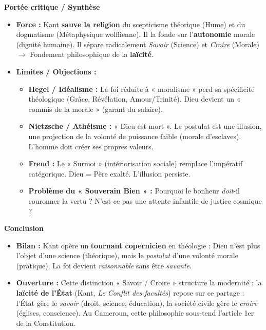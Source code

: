 \documentclass[11pt]{article}
\begin{document}
\begin{exoresolu}
\textbf{Portée critique / Synthèse}
\begin{itemize}
    \item \textbf{Force :} Kant \textbf{sauve la religion} du scepticisme théorique (Hume) et du dogmatisme (Métaphysique wolffienne). Il la fonde sur l'\textbf{autonomie} morale (dignité humaine). Il sépare radicalement \emph{Savoir} (Science) et \emph{Croire} (Morale) $\rightarrow$ Fondement philosophique de la \textbf{laïcité}.
    \item \textbf{Limites / Objections :}
    \begin{itemize}
        \item \textbf{Hegel / Idéalisme :} La foi réduite à « moralisme » perd sa spécificité théologique (Grâce, Révélation, Amour/Trinité). Dieu devient un « commis de la morale » (garant du salaire).
        \item \textbf{Nietzsche / Athéisme :} « Dieu est mort ». Le postulat est une illusion, une projection de la volonté de puissance faible (morale d'esclaves). L'homme doit créer ses propres valeurs.
        \item \textbf{Freud :} Le « Surmoi » (intériorisation sociale) remplace l'impératif catégorique. Dieu = Père exalté. L'illusion persiste.
        \item \textbf{Problème du « Souverain Bien » :} Pourquoi le bonheur \emph{doit}-il couronner la vertu ? N'est-ce pas une attente infantile de justice cosmique ?
    \end{itemize}
\end{itemize}

\textbf{Conclusion}
\begin{itemize}
    \item \textbf{Bilan :} Kant opère un \textbf{tournant copernicien} en théologie : Dieu n'est plus l'objet d'une science (théorique), mais le \emph{postulat} d'une volonté morale (pratique). La foi devient \emph{raisonnable} sans être \emph{savante}.
    \item \textbf{Ouverture :} Cette distinction « Savoir / Croire » structure la modernité : la \textbf{laïcité de l'État} (Kant, \emph{Le Conflit des facultés}) repose sur ce partage : l'État gère le \emph{savoir} (droit, science, éducation), la société civile gère le \emph{croire} (églises, conscience). Au Cameroun, cette philosophie sous-tend l'article 1er de la Constitution.
\end{itemize}
\end{exoresolu}
\end{document}
